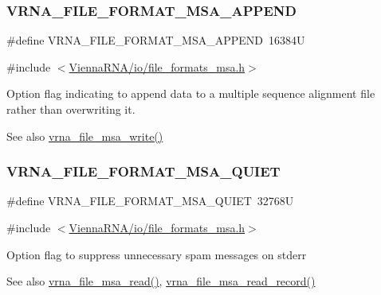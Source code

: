 \subsubsection{\texorpdfstring{VRNA\_FILE\_FORMAT\_MSA\_APPEND}{VRNA\_FILE\_FORMAT\_MSA\_APPEND}}
{\footnotesize\ttfamily \#define V\+R\+N\+A\+\_\+\+F\+I\+L\+E\+\_\+\+F\+O\+R\+M\+A\+T\+\_\+\+M\+S\+A\+\_\+\+A\+P\+P\+E\+ND~16384U}



{\ttfamily \#include $<$\mbox{\hyperlink{io_2file__formats__msa_8h}{Vienna\+R\+N\+A/io/file\+\_\+formats\+\_\+msa.\+h}}$>$}



Option flag indicating to append data to a multiple sequence alignment file rather than overwriting it. 

\begin{DoxySeeAlso}{See also}
\mbox{\hyperlink{group__file__formats__msa_gaccca55b71d34def88e18ed9a51ccb2bf}{vrna\+\_\+file\+\_\+msa\+\_\+write()}} 
\end{DoxySeeAlso}
\mbox{\label{group__file__formats__msa_ga73aa3701a22c5acfcb2e8927287a0554}} 
\subsubsection{\texorpdfstring{VRNA\_FILE\_FORMAT\_MSA\_QUIET}{VRNA\_FILE\_FORMAT\_MSA\_QUIET}}
{\footnotesize\ttfamily \#define V\+R\+N\+A\+\_\+\+F\+I\+L\+E\+\_\+\+F\+O\+R\+M\+A\+T\+\_\+\+M\+S\+A\+\_\+\+Q\+U\+I\+ET~32768U}



{\ttfamily \#include $<$\mbox{\hyperlink{io_2file__formats__msa_8h}{Vienna\+R\+N\+A/io/file\+\_\+formats\+\_\+msa.\+h}}$>$}



Option flag to suppress unnecessary spam messages on {\ttfamily stderr} 

\begin{DoxySeeAlso}{See also}
\mbox{\hyperlink{group__file__formats__msa_gad02d5d12bda54611c915a1019323b7be}{vrna\+\_\+file\+\_\+msa\+\_\+read()}}, \mbox{\hyperlink{group__file__formats__msa_gad4203a438622b2df7bc2f16578d54799}{vrna\+\_\+file\+\_\+msa\+\_\+read\+\_\+record()}} 
\end{DoxySeeAlso}
\mbox{\label{group__file__formats__msa_gad98ca08968d19f221f29d2a1faf26887}} 
